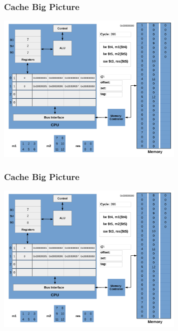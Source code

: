 \documentclass{beamer}
\begin{document}
\begin{frame}[fragile]
\frametitle{Cache Big Picture}

\begin{center}
\vspace*{-0.23cm}
\hspace*{-1cm}\includegraphics[width=9cm]{cache19.pdf}
\end{center}

\end{frame}

\begin{frame}[fragile]
\frametitle{Cache Big Picture}

\begin{center}
\vspace*{-0.23cm}
\hspace*{-1cm}\includegraphics[width=9cm]{cache20.pdf}
\end{center}

\end{frame}
\end{document}
